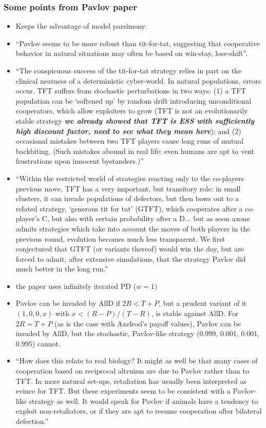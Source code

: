 \subsubsection{Some points from Pavlov paper}
\begin{itemize}
\item Keeps the advantage of model parsimony.
\item ``Pavlov seems to be more robust than tit-for-tat, suggesting that cooperative behavior in natural situations may often be based on win-stay, lose-shift''.
\item ``The conspicuous success of the tit-for-tat strategy relies in part on the clinical neatness of a deterministic cyber-world. In natural populations, errors occur. TFT suffers from stochastic perturbations in two ways: (1) a TFT population can be `softened up' by random drift introducing unconditional cooperators, which allow exploiters to grow (TFT is not an evolutionarily stable strategy \textit{\textbf{we already showed that TFT is ESS with sufficiently high discount factor, need to see what they mean here}}); and (2) occasional mistakes between two TFT players cause long runs of mutual backbiting. (Such mistakes abound in real life: even humans are apt to vent frustrations upon innocent bystanders.)''
\item ``Within the restricted world of strategies reacting only to the co-players previous move, TFT has a very important, but transitory role: in small clusters, it can invade populations of defectors, but then bows out to a related strategy, `generous tit for tat' (GTFT), which cooperates after a co-player's C, but also with certain probability after a D... but as soon axone admits strategies which take into account the moves of both players in the previous round, evolution becomes much less transparent. We first conjectured that GTFT (or variants thereof) would win the day, but are forced to admit, after extensive simulations, that the strategy Pavlov did much better in the long run.''
\item the paper uses infinitely iterated PD ($w = 1$)
\item Pavlov can be invaded by AllD if $2R < T+P$, but a prudent variant of it $(1, 0, 0, x)$ with $x<(R-P)/(T-R)$, is stable against AllD. For $2R = T+P$ (as is the case with Axelrod's payoff values), Pavlov can be invaded by AllD, but the stochastic, Pavlov-like strategy (0.999, 0.001, 0.001, 0.995) cannot.
\item ``How does this relate to real biology? It might as well be that many cases of cooperation based on reciprocal altruism are due to Pavlov rather than to TFT. In more natural set-ups, retaliation has usually been interpreted as evince for TFT. But these experiments seem to be consistent with a Pavlov-like strategy as well. It would speak for Pavlov if animals have a tendency to exploit non-retaliators, or if they are apt to resume cooperation after bilateral defection.''

\end{itemize}


